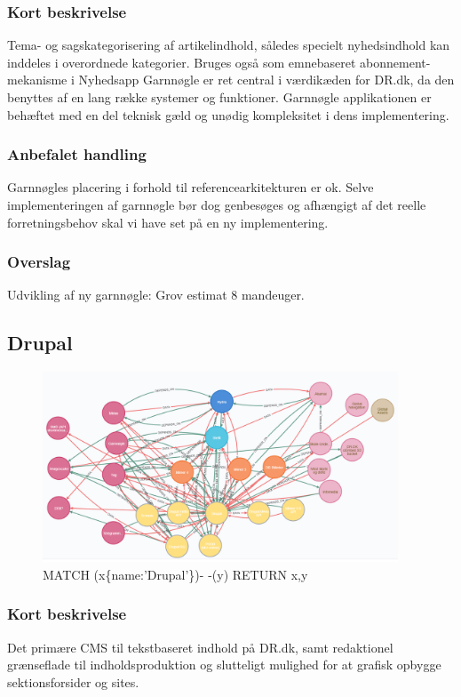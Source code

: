 \documentclass{article}
\begin{document}
\subsubsection{Kort beskrivelse}
Tema- og sagskategorisering af artikelindhold, således specielt nyhedsindhold kan inddeles i overordnede kategorier. Bruges også som emnebaseret abonnement-mekanisme i Nyhedsapp
Garnnøgle er ret central i værdikæden for DR.dk, da den benyttes af en lang række systemer og funktioner. Garnnøgle applikationen er behæftet med en del teknisk gæld og unødig kompleksitet i dens implementering.
\subsubsection{Anbefalet handling}
Garnnøgles placering i forhold til referencearkitekturen er ok. Selve implementeringen af garnnøgle bør dog genbesøges og afhængigt af det reelle forretningsbehov skal vi have set på en ny implementering.
\subsubsection{Overslag}
Udvikling af ny garnnøgle: Grov estimat 8 mandeuger.


\subsection{Drupal}
\begin{figure}[h]
\includegraphics[width=300pt]{Drupal.PNG}
\caption{MATCH (x\{name:'Drupal'\})- -(y) RETURN x,y}
\end{figure}
\subsubsection{Kort beskrivelse}
Det primære CMS til tekstbaseret indhold på DR.dk, samt redaktionel grænseflade til indholdsproduktion og slutteligt mulighed for at grafisk opbygge sektionsforsider og sites.
\end{document}
